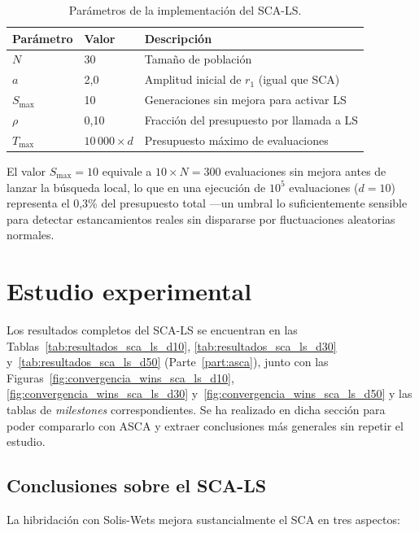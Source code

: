 \documentclass[12pt,a4paper]{article}
\begin{document}
\begin{table}[H]
\centering
\renewcommand{\arraystretch}{1.3}
\begin{tabular}{lll}
\toprule
\textbf{Parámetro} & \textbf{Valor} & \textbf{Descripción} \\
\midrule
$N$              & 30                  & Tamaño de población \\
$a$              & 2{,}0               & Amplitud inicial de $r_1$ (igual que SCA) \\
$S_{\max}$       & 10                  & Generaciones sin mejora para activar LS \\
$\rho$           & 0{,}10              & Fracción del presupuesto por llamada a LS \\
$T_{\max}$       & $10\,000 \times d$  & Presupuesto máximo de evaluaciones \\
\bottomrule
\end{tabular}
\caption{Parámetros de la implementación del SCA-LS.}
\label{tab:parametros_sca_ls}
\end{table}
 
El valor $S_{\max}=10$ equivale a $10 \times N = 300$ evaluaciones sin mejora antes de lanzar la búsqueda local, lo que en una ejecución de $10^5$ evaluaciones ($d=10$) representa el 0{,}3\% del presupuesto total ---un umbral lo suficientemente sensible para detectar estancamientos reales sin dispararse por fluctuaciones aleatorias normales.

\section{Estudio experimental}

Los resultados completos del SCA-LS se encuentran en las Tablas~\ref{tab:resultados_sca_ls_d10}, \ref{tab:resultados_sca_ls_d30} y~\ref{tab:resultados_sca_ls_d50} (Parte~\ref{part:asca}), junto con las Figuras~\ref{fig:convergencia_wins_sca_ls_d10}, \ref{fig:convergencia_wins_sca_ls_d30} y~\ref{fig:convergencia_wins_sca_ls_d50} y las tablas de \textit{milestones} correspondientes. Se ha realizado en dicha sección para poder compararlo con ASCA y extraer conclusiones más generales sin repetir el estudio.
 
\subsection{Conclusiones sobre el SCA-LS}
 
La hibridación con Solis-Wets mejora sustancialmente el SCA en tres aspectos:
 
\end{document}

